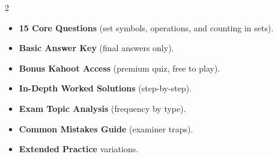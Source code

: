 \documentclass[11pt,a4paper]{article}
\newcommand{\FullReleaseDate}{April 30, 2026}
\begin{document}
\vspace{8pt}

\begin{multicols}{2}
  \begin{tcolorbox}[card, title=\sffamily\bfseries\textcolor{white}{\faHandPointDown\ TODAY (Simplified Version)}, colbacktitle=mainblue, boxed title style={sharp corners, boxrule=0pt}]
    \begin{itemize}[leftmargin=1.2em, itemsep=2pt]
      \item \small \textbf{15 Core Questions} (set symbols, operations, and counting in sets).
      \item \small \textbf{Basic Answer Key} (final answers only).
      \item \small \textbf{Bonus Kahoot Access} (premium quiz, free to play).
    \end{itemize}
  \end{tcolorbox}

  \columnbreak

  \begin{tcolorbox}[card, title=\sffamily\bfseries\textcolor{white}{\faRocket\ ON \FullReleaseDate\ (Full Upgrade)}, colbacktitle=mainblue, boxed title style={sharp corners, boxrule=0pt}]
    \begin{itemize}[leftmargin=1.2em, itemsep=2pt]
      \item \small \textbf{In-Depth Worked Solutions} (step-by-step).
      \item \small \textbf{Exam Topic Analysis} (frequency by type).
      \item \small \textbf{Common Mistakes Guide} (examiner traps).
      \item \small \textbf{Extended Practice} variations.
    \end{itemize}
  \end{tcolorbox}
\end{multicols}
\end{document}
